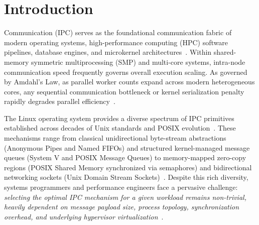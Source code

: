 \section{Introduction}
\label{sec:introduction}

 Communication (IPC) serves as the foundational communication fabric of modern operating systems, high-performance computing (HPC) software pipelines, database engines, and microkernel architectures~\cite{silberschatz2018operating,kerrisk2010linux}. Within shared-memory symmetric multiprocessing (SMP) and multi-core systems, intra-node communication speed frequently governs overall execution scaling. As governed by Amdahl's Law, as parallel worker counts expand across modern heterogeneous cores, any sequential communication bottleneck or kernel serialization penalty rapidly degrades parallel efficiency~\cite{herlihy2020art}.

The Linux operating system provides a diverse spectrum of IPC primitives established across decades of Unix standards and POSIX evolution~\cite{posix2018standard,stevens1999unixipc}. These mechanisms range from classical unidirectional byte-stream abstractions (Anonymous Pipes and Named FIFOs) and structured kernel-managed message queues (System V and POSIX Message Queues) to memory-mapped zero-copy regions (POSIX Shared Memory synchronized via semaphores) and bidirectional networking sockets (Unix Domain Stream Sockets)~\cite{kerrisk2010linux,stevens2004unix}. Despite this rich diversity, systems programmers and performance engineers face a pervasive challenge: \textit{selecting the optimal IPC mechanism for a given workload remains non-trivial, heavily dependent on message payload size, process topology, synchronization overhead, and underlying hypervisor virtualization}~\cite{danyliuk2026classical,gregg2020systems}.

